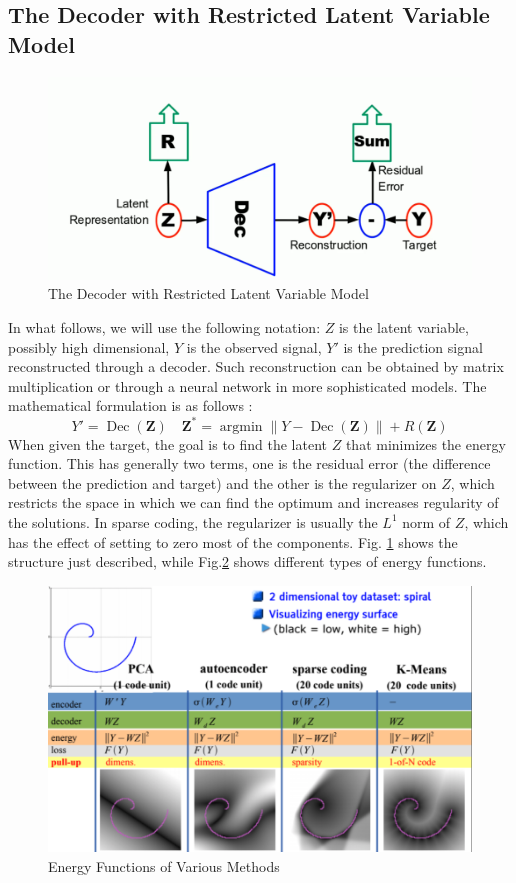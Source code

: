 \documentclass[12pt,letterpaper]{article}
\begin{document}
\subsection*{The Decoder with Restricted Latent Variable Model}
\begin{figure}[H]
\centering
\includegraphics[width=1.0\linewidth]{decoder.png}
\caption{The Decoder with Restricted Latent Variable Model}

\label{fig:decoder}
\end{figure}
In what follows, we will use the following notation: $Z$ is the latent variable, possibly high dimensional, $Y$ is the observed signal, $Y'$ is the prediction signal reconstructed through a decoder. Such reconstruction can be obtained by matrix multiplication or through a neural network in more sophisticated models. The mathematical formulation is as follows : 
\[Y'=\operatorname{Dec}(\mathbf{Z}) \quad \mathbf{Z}^{*}=\operatorname{argmin}\|Y-\operatorname{Dec}(\mathbf{Z})\|+R(\mathbf{Z})\]
When given the target, the goal is to find the latent $Z$ that minimizes the energy function. This has generally two terms, one is the residual error (the difference between the prediction and target) and the other is the regularizer on $Z$, which restricts the space in which we can find the optimum and increases regularity of the solutions. In sparse coding, the regularizer is usually the $L^1$ norm of $Z$, which has the effect of setting to zero most of the components. Fig. \ref{fig:decoder} shows the structure just described, while Fig.\ref{fig:energy} shows different types of energy functions.

\begin{figure}[H]
\centering
\includegraphics[width=1.0\linewidth]{ernergy.png}
\caption{Energy Functions of Various Methods}

\label{fig:energy}
\end{figure}
\end{document}
